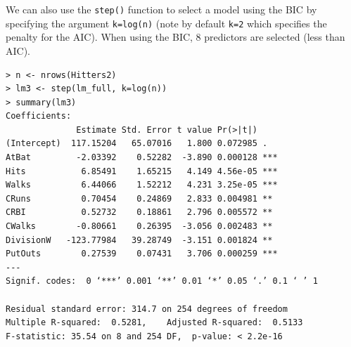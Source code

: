 \documentclass[10pt]{beamer}\usepackage[]{graphicx}\usepackage[]{color}
\begin{document}
\begin{frame}[fragile]
We can also use the \texttt{step()} function to select a model using the BIC by specifying the argument \texttt{k=log(n)} (note by default \texttt{k=2} which specifies the penalty for the AIC).  When using the BIC, 8 predictors are selected (less than AIC).  
\scriptsize
\begin{verbatim}
> n <- nrows(Hitters2)
> lm3 <- step(lm_full, k=log(n))
> summary(lm3)
Coefficients:
              Estimate Std. Error t value Pr(>|t|)    
(Intercept)  117.15204   65.07016   1.800 0.072985 .  
AtBat         -2.03392    0.52282  -3.890 0.000128 ***
Hits           6.85491    1.65215   4.149 4.56e-05 ***
Walks          6.44066    1.52212   4.231 3.25e-05 ***
CRuns          0.70454    0.24869   2.833 0.004981 ** 
CRBI           0.52732    0.18861   2.796 0.005572 ** 
CWalks        -0.80661    0.26395  -3.056 0.002483 ** 
DivisionW   -123.77984   39.28749  -3.151 0.001824 ** 
PutOuts        0.27539    0.07431   3.706 0.000259 ***
---
Signif. codes:  0 ‘***’ 0.001 ‘**’ 0.01 ‘*’ 0.05 ‘.’ 0.1 ‘ ’ 1

Residual standard error: 314.7 on 254 degrees of freedom
Multiple R-squared:  0.5281,	Adjusted R-squared:  0.5133 
F-statistic: 35.54 on 8 and 254 DF,  p-value: < 2.2e-16
\end{verbatim}
\end{frame}
\end{document}
